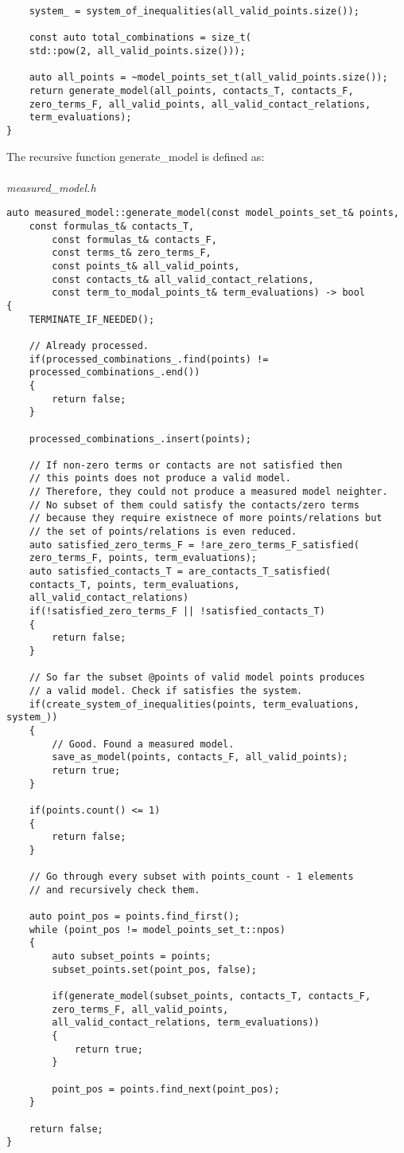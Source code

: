 \documentclass{article}
\begin{document}
\begin{lstlisting}
    system_ = system_of_inequalities(all_valid_points.size());

    const auto total_combinations = size_t(
	std::pow(2, all_valid_points.size()));

    auto all_points = ~model_points_set_t(all_valid_points.size());
    return generate_model(all_points, contacts_T, contacts_F,
	zero_terms_F, all_valid_points, all_valid_contact_relations,
	term_evaluations);
}
\end{lstlisting}
	The recursive function generate\_model is defined as: \\
	\\
\noindent
\textit{measured\_model.h}
\begin{lstlisting}
auto measured_model::generate_model(const model_points_set_t& points,
	const formulas_t& contacts_T,
        const formulas_t& contacts_F,
        const terms_t& zero_terms_F,
        const points_t& all_valid_points,
        const contacts_t& all_valid_contact_relations,
        const term_to_modal_points_t& term_evaluations) -> bool
{
    TERMINATE_IF_NEEDED();

    // Already processed.
    if(processed_combinations_.find(points) !=
	processed_combinations_.end())
    {
        return false;
    }

    processed_combinations_.insert(points);

    // If non-zero terms or contacts are not satisfied then 
    // this points does not produce a valid model.
    // Therefore, they could not produce a measured model neighter.
    // No subset of them could satisfy the contacts/zero terms 
    // because they require existnece of more points/relations but 
    // the set of points/relations is even reduced.
    auto satisfied_zero_terms_F = !are_zero_terms_F_satisfied(
	zero_terms_F, points, term_evaluations);
    auto satisfied_contacts_T = are_contacts_T_satisfied(
	contacts_T, points, term_evaluations,
	all_valid_contact_relations)
    if(!satisfied_zero_terms_F || !satisfied_contacts_T)
    {
        return false;
    }

    // So far the subset @points of valid model points produces
    // a valid model. Check if satisfies the system.
    if(create_system_of_inequalities(points, term_evaluations, system_))
    {
        // Good. Found a measured model.
        save_as_model(points, contacts_F, all_valid_points);
        return true;
    }

    if(points.count() <= 1)
    {
        return false;
    }

    // Go through every subset with points_count - 1 elements
    // and recursively check them.

    auto point_pos = points.find_first();
    while (point_pos != model_points_set_t::npos)
    {
        auto subset_points = points;
        subset_points.set(point_pos, false);

        if(generate_model(subset_points, contacts_T, contacts_F, 
		zero_terms_F, all_valid_points,
		all_valid_contact_relations, term_evaluations))
        {
            return true;
        }

        point_pos = points.find_next(point_pos);
    }

    return false;
}
\end{lstlisting}
\end{document}
